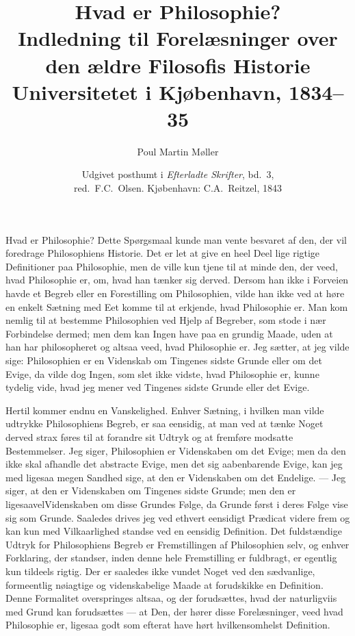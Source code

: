 \documentclass[12pt]{article}
\title{\textbf{Hvad er Philosophie?}\\[0.5em]
  \large Indledning til Forelæsninger over den ældre Filosofis Historie\\
  Universitetet i Kjøbenhavn, 1834--35}
\author{Poul Martin Møller}
\date{Udgivet posthumt i \textit{Efterladte Skrifter}, bd.~3,\\
  red.\ F.C.\ Olsen. Kjøbenhavn: C.A.\ Reitzel, 1843}
\begin{document}
\maketitle



\noindent
Hvad er Philosophie? Dette Spørgsmaal kunde man vente besvaret
af den, der vil foredrage Philosophiens Historie. Det er let at
give en heel Deel lige rigtige Definitioner paa Philosophie, men
de ville kun tjene til at minde den, der veed, hvad Philosophie
er, om, hvad han tænker sig derved. Dersom han ikke i Forveien
havde et Begreb eller en Forestilling om Philosophien, vilde han
ikke ved at høre en enkelt Sætning med Eet komme til at
erkjende, hvad Philosophie er. Man kom nemlig til at bestemme
Philosophien ved Hjelp af Begreber, som stode i nær Forbindelse
dermed; men dem kan Ingen have paa en grundig Maade, uden at han
har philosopheret og altsaa veed, hvad Philosophie er. Jeg
sætter, at jeg vilde sige: Philosophien er en Videnskab om
Tingenes sidste Grunde eller om det Evige, da vilde dog Ingen,
som slet ikke vidste, hvad Philosophie er, kunne tydelig vide,
hvad jeg mener ved Tingenes sidste Grunde eller det Evige.

Hertil kommer endnu en Vanskelighed. Enhver Sætning, i hvilken
man vilde udtrykke Philosophiens Begreb, er saa eensidig, at man
ved at tænke Noget derved strax føres til at forandre sit Udtryk
og at fremføre modsatte Bestemmelser. Jeg siger, Philosophien er
Videnskaben om det Evige; men da den ikke skal afhandle det
abstracte Evige, men det sig aabenbarende Evige, kan jeg med
ligesaa megen Sandhed sige, at den er Videnskaben om det
Endelige. --- Jeg siger, at den er Videnskaben om Tingenes
sidste Grunde; men den er ligesaavelVidenskaben om disse
Grundes Følge, da Grunde først i deres Følge vise sig som
Grunde. Saaledes drives jeg ved ethvert eensidigt Prædicat
videre frem og kan kun med Vilkaarlighed standse ved en
eensidig Definition. Det fuldstændige Udtryk for Philosophiens
Begreb er Fremstillingen af Philosophien selv, og enhver
Forklaring, der standser, inden denne hele Fremstilling er
fuldbragt, er egentlig kun tildeels rigtig. Der er saaledes
ikke vundet Noget ved den sædvanlige, formeentlig nøiagtige
og videnskabelige Maade at forudskikke en Definition. Denne
Formalitet overspringes altsaa, og der forudsættes, hvad der
naturligviis med Grund kan forudsættes --- at Den, der hører
disse Forelæsninger, veed hvad Philosophie er, ligesaa godt
som efterat have hørt hvilkensomhelst Definition.
\end{document}
